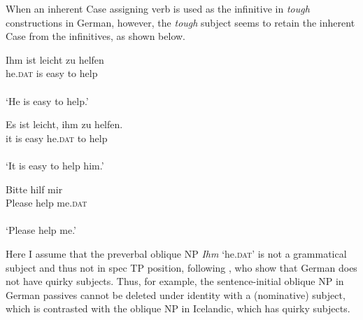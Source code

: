 \documentclass[output=paper,colorlinks,citecolor=brown,
]{langscibook}
\begin{document}
When an inherent Case assigning verb is used as the infinitive in \textit{tough} constructions in German, however, the \textit{tough} subject seems to retain the inherent Case from the infinitives, as shown below.

\begin{exe}
\ex \label{19ha}
\begin{xlist}
\ex \label{19aha}
\gll Ihm ist leicht zu helfen\\
he.\textsc{dat} is easy to help\\\\
‘He is easy to help.’

\ex \label{19bha}
\gll Es ist leicht, ihm zu helfen.\\
it is easy he.\textsc{dat} to help\\\\
‘It is easy to help him.’

\end{xlist}

\ex \label{20ha}
\gll Bitte   hilf   mir\\
Please help me.\textsc{dat}\\\\
 ‘Please help me.’
\end{exe}

Here I assume that the preverbal oblique NP \textit{Ihm} ‘he.\textsc{dat}’ is not a grammatical subject and thus not in spec TP position, following \citet{ZaenenThráinsson1985}, who show that German does not have quirky subjects. Thus, for example, the sentence-initial oblique NP in German passives cannot be deleted under identity with a (nominative) subject, which is contrasted with the oblique NP in Icelandic, which has quirky subjects.
\end{document}
